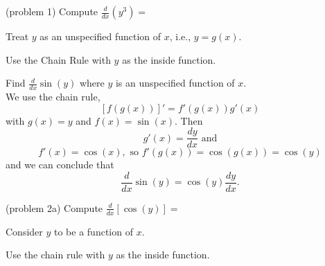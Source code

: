 \documentclass{ximera}
\begin{document}
\begin{problem}(problem 1)
Compute
$\displaystyle{\frac{d}{dx} \left(y^3\right)=}$
 
\begin{multipleChoice}
\end{multipleChoice}

\begin{hint}
Treat $y$ as an unspecified function of $x$, i.e., $y = g(x)$.
\end{hint}

\begin{hint}
Use the Chain Rule with $y$ as the inside function.
\end{hint}
		
\end{problem}


  

\begin{example}[example 2]
Find $\frac{d}{dx} \sin(y)$ where $y$ is an unspecified function of $x$.\\
We use the chain rule,
\[\displaystyle{[f(g(x))]' = f'(g(x))g'(x)}\]
with $g(x) = y$ and $f(x) = \sin(x)$. Then 
\[g'(x) = \frac{dy}{dx} \text{ and}\]
\[f'(x) = \cos(x), \text{ so } f'(g(x)) = \cos(g(x)) = \cos(y)\]
and we can conclude that
\[\frac{d}{dx} \sin(y) = \cos(y) \frac{dy}{dx}.\]
\end{example}


\begin{center}
\begin{foldable}
\end{foldable}
\end{center}

\begin{problem}(problem 2a)
Compute
$\displaystyle{\frac{d}{dx} \left[\cos(y)\right]=}$
 
\begin{multipleChoice}
\end{multipleChoice}  
  
  
	  
    \begin{hint}
      Consider $y$ to be a function of $x$.
    \end{hint}
    \begin{hint}
      Use the chain rule with $y$ as the inside function.
    \end{hint}
		
\end{problem}
\end{document}
